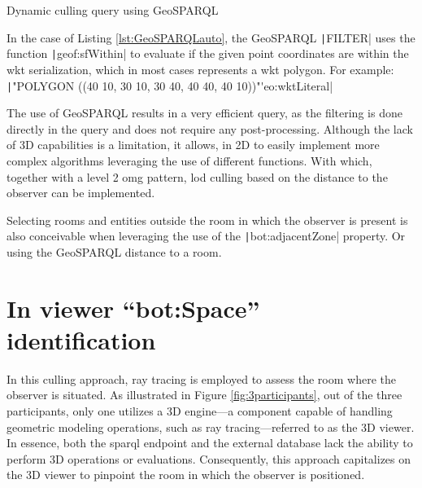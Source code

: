 \begin{listing}[H]
    \inputminted{sparql}{dynamicQueries/inSitu/query.rq}
    \vspace{-0.7cm}
    \caption{Dynamic culling query using GeoSPARQL}
    \label{lst:GeoSPARQLauto}
\end{listing}

In the case of Listing \ref{lst:GeoSPARQLauto}, the GeoSPARQL \texttt|FILTER| uses the function \texttt|geof:sfWithin| to evaluate if the given point coordinates are within the \ac{wkt} serialization, which in most cases represents a \ac{wkt} polygon. For example:\\
\texttt|"POLYGON ((40 10, 30 10, 30 40, 40 40, 40 10))"^^geo:wktLiteral|

The use of GeoSPARQL results in a very efficient query, as the filtering is done directly in the query and does not require any post-processing. Although the lack of 3D capabilities is a limitation, it allows, in 2D to easily implement more complex algorithms leveraging the use of different functions. With which, together with a level 2 \ac{omg} pattern, \ac{lod} culling based on the distance to the observer can be implemented.

Selecting rooms and entities outside the room in which the observer is present is also conceivable when leveraging the use of the \texttt|bot:adjacentZone| property. Or using the GeoSPARQL distance to a room.

\section{In viewer \enquote{bot:Space} identification} \label{sec:inViewer}
In this culling approach, ray tracing is employed to assess the room where the observer is situated. As illustrated in Figure \ref{fig:3participants}, out of the three participants, only one utilizes a 3D engine—a component capable of handling geometric modeling operations, such as ray tracing—referred to as the 3D viewer. In essence, both the \ac{sparql} endpoint and the external database lack the ability to perform 3D operations or evaluations. Consequently, this approach capitalizes on the 3D viewer to pinpoint the room in which the observer is positioned.

